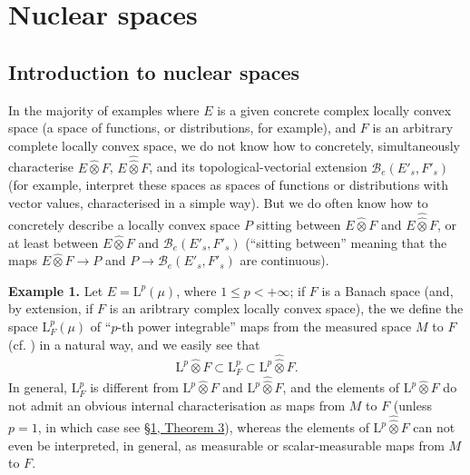 \documentclass[british]{article}
\newenvironment{rmenv}[1]
  {\phantomsection\par\smallskip\noindent\textbf{#1.}\rmfamily}
  {\par\smallskip}
\newcommand{\oldpage}[1]{\marginpar{\footnotesize$\Big\vert$ \textit{p.~#1}}}
\begin{document}
\section{Nuclear spaces}\label{section-2}

\subsection{Introduction to nuclear spaces}\label{section-2.1}

\oldpage{98}

In the majority of examples where \(E\) is a given concrete complex
locally convex space (a space of functions, or distributions, for
example), and \(F\) is an arbitrary complete locally convex space, we do
not know how to concretely, simultaneously characterise
\(E\hat{\otimes}F\), \(E\hat{\hat{\otimes}}F\), and its
topological-vectorial extension \(\mathscr{B}_e(E'_s,F'_s)\) (for
example, interpret these spaces as spaces of functions or distributions
with vector values, characterised in a simple way). But we do often know
how to concretely describe a locally convex space \(P\) sitting between
\(E\hat{\otimes}F\) and \(E\hat{\hat{\otimes}}F\), or at least between
\(E\hat{\otimes}F\) and \(\mathscr{B}_e(E'_s,F'_s)\) (``sitting
between'' meaning that the maps \(E\hat{\otimes}F\to P\) and
\(P\to\mathscr{B}_e(E'_s,F'_s)\) are continuous).

\protect{}\label{section-2-example-1}
\begin{rmenv}{Example 1}
Let \(E=\mathrm{L}^p(\mu)\), where \(1\leqslant p<+\infty\); if \(F\) is
a Banach space (and, by extension, if \(F\) is an aribtrary complex
locally convex space), the we define the space \(\mathrm{L}_F^p(\mu)\)
of ``\(p\)-th power integrable'' maps from the measured space \(M\) to
\(F\) (cf. \autocite{2}) in a natural way, and we easily see that \[
  \mathrm{L}^p\hat{\otimes}F \subset \mathrm{L}_F^p \subset \mathrm{L}^p\hat{\hat{\otimes}}F.
\] In general, \(\mathrm{L}_F^p\) is different from
\(\mathrm{L}^p\hat{\otimes}F\) and \(\mathrm{L}^p\hat{\hat{\otimes}}F\),
and the elements of \(\mathrm{L}^p\hat{\otimes}F\) do not admit an
obvious internal characterisation as maps from \(M\) to \(F\) (unless
\(p=1\), in which case see \hyperref[section-1-theorem-3]{§1, Theorem
3}), whereas the elements of \(\mathrm{L}^p\hat{\hat{\otimes}}F\) can
not even be interpreted, in general, as measurable or scalar-measurable
maps from \(M\) to \(F\).

\end{rmenv}
\end{document}
